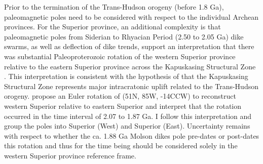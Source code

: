 \documentclass[twocolumn, switch]{article} %
\begin{document}
Prior to the termination of the Trans-Hudson orogeny (before 1.8 Ga), paleomagnetic poles need to be considered with respect to the individual Archean provinces. For the Superior province, an additional complexity is that paleomagnetic poles from Siderian to Rhyacian Period (2.50 to 2.05 Ga) dike swarms, as well as deflection of dike trends, support an interpretation that there was substantial Paleoproterozoic rotation of the western Superior province relative to the eastern Superior province across the Kapuskasing Structural Zone \citep{Bates1991a, Evans2010a}. This interpretation is consistent with the hypothesis of \citet{Hoffman1988a} that the Kapuskasing Structural Zone represents major intracratonic uplift related to the Trans-Hudson orogeny. \cite{Evans2010a} propose an Euler rotation of (51\textdegree N, 85\textdegree W, -14\textdegree CCW) to reconstruct western Superior relative to eastern Superior and interpret that the rotation occurred in the time interval of 2.07 to 1.87 Ga.  I follow this interpretation and group the poles into Superior (West) and Superior (East).  Uncertainty remains with respect to whether the ca. 1.88 Ga Molson dikes pole pre-dates or post-dates this rotation \citep{Evans2010a} and thus for the time being should be considered solely in the western Superior province reference frame.
\end{document}
